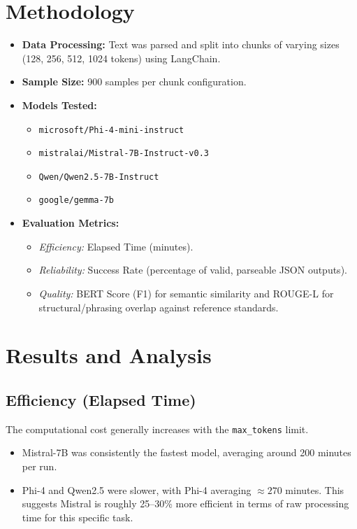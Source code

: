 \documentclass[12pt, a4paper]{article}
\begin{document}
\section{Methodology}
\begin{itemize}
    \item \textbf{Data Processing:} Text was parsed and split into chunks of varying sizes (128, 256, 512, 1024 tokens) using LangChain.
    \item \textbf{Sample Size:} 900 samples per chunk configuration.

    \newpage
    \item \textbf{Models Tested:}
    \begin{itemize}
        \item \texttt{microsoft/Phi-4-mini-instruct}
        \item \texttt{mistralai/Mistral-7B-Instruct-v0.3}
        \item \texttt{Qwen/Qwen2.5-7B-Instruct}
        \item \texttt{google/gemma-7b}
    \end{itemize}
    \item \textbf{Evaluation Metrics:}
    \begin{itemize}
        \item \textit{Efficiency:} Elapsed Time (minutes).
        \item \textit{Reliability:} Success Rate (percentage of valid, parseable JSON outputs).
        \item \textit{Quality:} BERT Score (F1) for semantic similarity and ROUGE-L for structural/phrasing overlap against reference standards.
    \end{itemize}
\end{itemize}

\section{Results and Analysis}

\subsection{Efficiency (Elapsed Time)}
The computational cost generally increases with the \texttt{max\_tokens} limit.

\begin{itemize}
    \item Mistral-7B was consistently the fastest model, averaging around 200 minutes per run.
    \item Phi-4 and Qwen2.5 were slower, with Phi-4 averaging $\approx 270$ minutes. This suggests Mistral is roughly 25--30\% more efficient in terms of raw processing time for this specific task.
\end{itemize}
\end{document}
